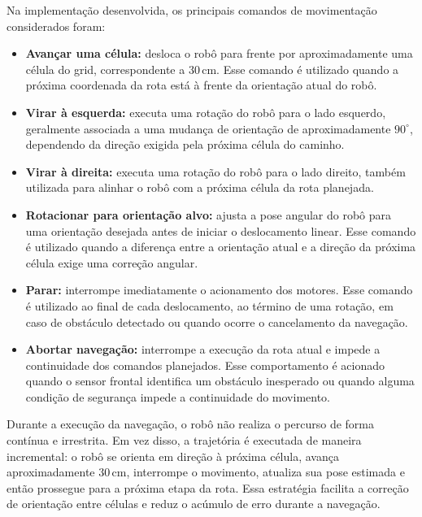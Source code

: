 \documentclass[	12pt, Times, openright, twoside, a4paper, english, brazil]{abntex2}
\begin{document}
Na implementação desenvolvida, os principais comandos de movimentação considerados foram:

\begin{itemize}
	\item \textbf{Avançar uma célula:} desloca o robô para frente por aproximadamente uma célula do grid, correspondente a $30\,\text{cm}$. Esse comando é utilizado quando a próxima coordenada da rota está à frente da orientação atual do robô.

	\item \textbf{Virar à esquerda:} executa uma rotação do robô para o lado esquerdo, geralmente associada a uma mudança de orientação de aproximadamente $90^\circ$, dependendo da direção exigida pela próxima célula do caminho.

	\item \textbf{Virar à direita:} executa uma rotação do robô para o lado direito, também utilizada para alinhar o robô com a próxima célula da rota planejada.

	\item \textbf{Rotacionar para orientação alvo:} ajusta a pose angular do robô para uma orientação desejada antes de iniciar o deslocamento linear. Esse comando é utilizado quando a diferença entre a orientação atual e a direção da próxima célula exige uma correção angular.

	\item \textbf{Parar:} interrompe imediatamente o acionamento dos motores. Esse comando é utilizado ao final de cada deslocamento, ao término de uma rotação, em caso de obstáculo detectado ou quando ocorre o cancelamento da navegação.

	\item \textbf{Abortar navegação:} interrompe a execução da rota atual e impede a continuidade dos comandos planejados. Esse comportamento é acionado quando o sensor frontal identifica um obstáculo inesperado ou quando alguma condição de segurança impede a continuidade do movimento.
\end{itemize}

Durante a execução da navegação, o robô não realiza o percurso de forma contínua e irrestrita. Em vez disso, a trajetória é executada de maneira incremental: o robô se orienta em direção à próxima célula, avança aproximadamente $30\,\text{cm}$, interrompe o movimento, atualiza sua pose estimada e então prossegue para a próxima etapa da rota. Essa estratégia facilita a correção de orientação entre células e reduz o acúmulo de erro durante a navegação.
\end{document}
